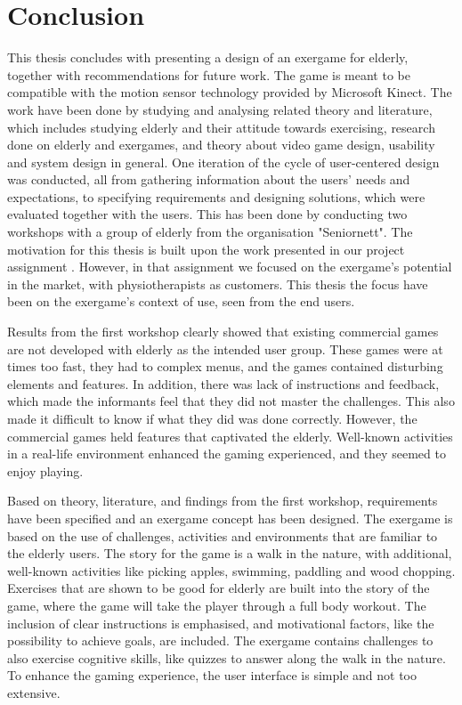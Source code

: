 \chapter{Conclusion}

This thesis concludes with presenting a design of an exergame for elderly, together with recommendations for future work. The game is meant to be compatible with the motion sensor technology provided by Microsoft Kinect. The work have been done by studying and analysing related theory and literature, which includes studying elderly and their attitude towards exercising, research done on elderly and exergames, and theory about video game design, usability and system design in general. One iteration of the cycle of user-centered design was conducted, all from gathering information about the users' needs and expectations, to specifying requirements and designing solutions, which were evaluated together with the users. This has been done by conducting two workshops with a group of elderly from the organisation "Seniornett". The motivation for this thesis is built upon the work presented in our project assignment \cite{project}. However, in that assignment we focused on the exergame's potential in the market, with physiotherapists as customers. This thesis the focus have been on the exergame's context of use, seen from the end users. 

Results from the first workshop clearly showed that existing commercial games are not developed with elderly as the intended user group. These games were at times too fast, they had to complex menus, and the games contained disturbing elements and features. In addition, there was lack of instructions and feedback, which made the informants feel that they did not master the challenges. This also made it difficult to know if what they did was done correctly. However, the commercial games held features that captivated the elderly. Well-known activities in a real-life environment enhanced the gaming experienced, and they seemed to enjoy playing. 

Based on theory, literature, and findings from the first workshop, requirements have been specified and an exergame concept has been designed. The exergame is based on the use of challenges, activities and environments that are familiar to the elderly users. The story for the game is a walk in the nature, with additional, well-known activities like picking apples, swimming, paddling and wood chopping. Exercises that are shown to be good for elderly are built into the story of the game, where the game will take the player through a full body workout. The inclusion of clear instructions is emphasised, and motivational factors, like the possibility to achieve goals, are included. The exergame contains challenges to also exercise cognitive skills, like quizzes to answer along the walk in the nature. To enhance the gaming experience, the user interface is simple and not too extensive.


